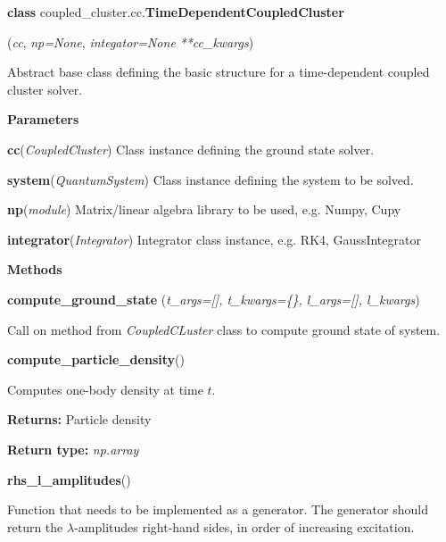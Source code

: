 \begin{tcolorbox}
    {\selectfont
    \textbf{class} coupled\_cluster.cc.\textbf{TimeDependentCoupledCluster}

    \hspace{1em}(\emph{cc}, \emph{np=None}, \emph{integator=None} \emph{**cc\_kwargs})

    \vspace{1em}
    Abstract base class defining the basic structure for a time-dependent coupled cluster 
    solver.

    \vspace{1em}
    \textbf{Parameters}

    \hspace{2em}\textbf{cc}(\emph{CoupledCluster})
        Class instance defining the ground state solver.

    \hspace{2em}\textbf{system}(\emph{QuantumSystem}) 
        Class instance defining the system to be solved.

    \hspace{2em}\textbf{np}(\emph{module})
        Matrix/linear algebra library to be used, e.g. Numpy, Cupy
    
    \hspace{2em}\textbf{integrator}(\emph{Integrator})
        Integrator class instance, e.g. RK4, GaussIntegrator

    \vspace{1em}
    \textbf{Methods}

    \hspace{2em} \textbf{compute\_ground\_state}
        (\emph{t\_args=[], \emph{t\_kwargs=\{\}},
        \emph{l\_args=[]}, \emph{l\_kwargs}})
        \begin{adjustwidth}{4em}{}
        Call on method from \emph{CoupledCLuster} class to compute ground
        state of system.           
        \end{adjustwidth}


    \hspace{2em} \textbf{compute\_particle\_density}()
        \begin{adjustwidth}{4em}{}
        Computes one-body density at time $t$.

        \textbf{Returns:} Particle density 

        \textbf{Return type:} \emph{np.array} 
        \end{adjustwidth}     

    \hspace{2em} \textbf{rhs\_l\_amplitudes}()
        \begin{adjustwidth}{4em}{}
        Function that needs to be implemented as a generator. The generator 
        should return the $\lambda$-amplitudes right-hand sides, in order of 
        increasing excitation.           
        \end{adjustwidth}

}
\end{tcolorbox}
